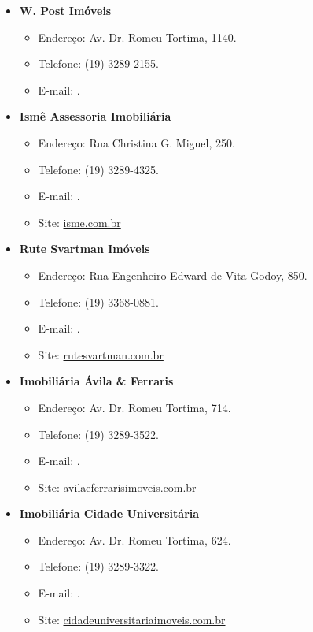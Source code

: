 \begin{itemize}
\item  \textbf{W. Post Imóveis}
\begin{itemize}
\item  Endereço: Av. Dr. Romeu Tortima, 1140.
\item  Telefone: (19) 3289-2155.
\item  E-mail: .
\end{itemize}

\item  \textbf{Ismê Assessoria Imobiliária}
\begin{itemize}
\item  Endereço: Rua Christina G. Miguel, 250.
\item  Telefone: (19) 3289-4325.
\item  E-mail: .
\item  Site: \url{isme.com.br}
\end{itemize}

\item  \textbf{Rute Svartman Imóveis}
\begin{itemize}
\item  Endereço: Rua Engenheiro Edward de Vita Godoy, 850.
\item  Telefone: (19) 3368-0881.
\item  E-mail: .
\item  Site: \url{rutesvartman.com.br}
\end{itemize}

\item  \textbf{Imobiliária Ávila \& Ferraris}
\begin{itemize}
\item  Endereço: Av. Dr. Romeu Tortima, 714.
\item  Telefone: (19) 3289-3522.
\item  E-mail: .
\item  Site: \url{avilaeferrarisimoveis.com.br}
\end{itemize}

\item  \textbf{Imobiliária Cidade Universitária}
\begin{itemize}
\item  Endereço: Av. Dr. Romeu Tortima, 624.
\item  Telefone: (19) 3289-3322.
\item  E-mail: .
\item  Site: \url{cidadeuniversitariaimoveis.com.br}
\end{itemize}


\end{itemize}
